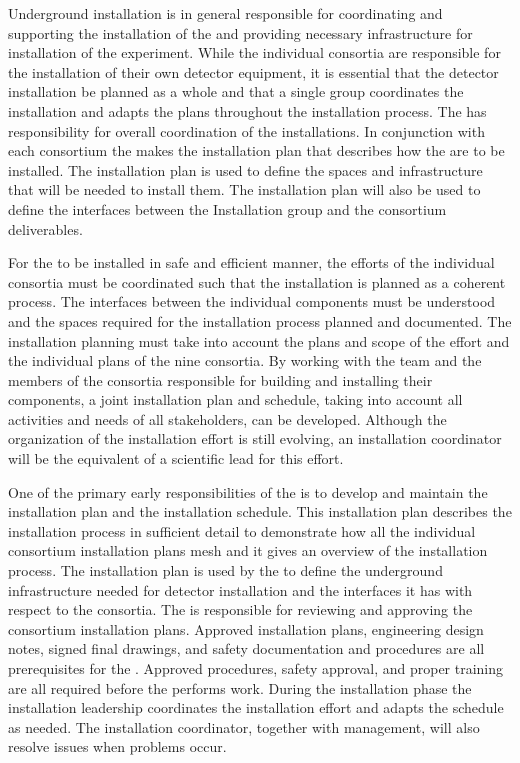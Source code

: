 Underground installation is in general responsible for coordinating
and supporting the installation of the  and providing
necessary infrastructure for installation of the experiment. While the
individual consortia are responsible for the installation of their own
detector equipment, it is essential that the detector installation be
planned as a whole and that a single group coordinates the
installation and adapts the plans throughout the installation
process. The  has responsibility for overall coordination
of the installations. In conjunction with each consortium the
 makes the installation plan that describes how the
 are to be installed. The installation plan is used to define
the spaces and infrastructure that will be needed to install them.
The installation plan will also be used to define the
interfaces between the Installation group and the consortium
deliverables.

For the  to be installed in safe and efficient
manner, the efforts of the individual consortia must be coordinated
such that the installation is planned as a coherent process. The
interfaces between the individual components must be understood
and the spaces required for the installation process planned and
documented. The installation planning must take into account the
plans and scope of the  effort and the individual plans of
the nine consortia. By working with the  team and the
members of the consortia responsible for building and installing their
components, a joint installation plan and schedule, taking into account
all activities and needs of all stakeholders, can be developed. Although
the organization of the installation effort is still evolving, 
an installation coordinator will be the equivalent of a scientific lead for this effort.

One of the primary early responsibilities of the  is to
develop and maintain the  installation plan and the
installation schedule. This installation plan 
describes the installation process in sufficient detail to demonstrate
how all the individual consortium installation plans mesh and it 
gives an overview of the installation process. The installation plan
is used by the  to define the underground infrastructure
needed for detector installation and the interfaces it has with respect  to 
the consortia. The  is responsible for reviewing and
approving the consortium installation plans. Approved installation
plans, engineering design notes, signed final drawings, and safety
documentation and procedures are all prerequisites for the . 
Approved procedures, safety approval, and
proper training are all required before the  performs
work. During the installation phase the installation leadership 
coordinates the  installation effort and adapts the schedule
as needed. The installation coordinator, together with management, will also
resolve issues when problems occur.




